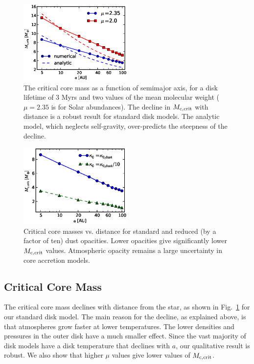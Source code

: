 \documentclass[apj, numberedappendix]{emulateapj}
\newcommand{\Fig}[1]{Fig.~\ref{#1}}
\def\crit{_{\rm{c, crit}}}
\begin{document}
\begin{figure}[htb]
\centering
\includegraphics[width=0.5\textwidth]{../../figs/ModelAtmospheres/RadSelfGravPoly/PaperFigs/Mcrit_vs_a_3Myrs_new.eps}
\caption{The critical core mass as a function of semimajor axis, for a disk lifetime of $3$ Myrs and two values of the mean molecular weight ($\mu = 2.35$ is for Solar abundances). The decline in $M_{\rm c,crit}$ with distance is a robust result for standard disk models.  The analytic model, which neglects self-gravity, over-predicts the steepness of the decline.}
\label{fig:Mcvsa}
\end{figure}

\begin{figure}[htb]
\centering
\includegraphics[width=0.5\textwidth]{../../figs/ModelAtmospheres/RadSelfGravPoly/PaperFigs/Mcrit_vs_a_3Myrs_opacity.eps}
\caption{Critical core masses vs. distance for standard and reduced (by a factor of ten) dust opacities.  Lower opacities give significantly lower $M\crit$ values.  Atmospheric opacity remains a large uncertainty in core accretion models.}
\label{fig:Mcritopacity}
\end{figure}

\subsection{Critical Core Mass}
\label{sec:critcore}

The critical core mass declines with distance from the star, as shown in \Fig{fig:Mcvsa} for our standard disk model.   The main reason for the decline, as explained above, is that atmospheres grow faster at lower temperatures.  The lower densities and pressures in the outer disk have a much smaller effect.  Since the vast majority of disk models have a disk temperature that declines with $a$, our qualitative result is robust.   We also show that higher $\mu$ values give lower values of $M\crit$.
\end{document}
